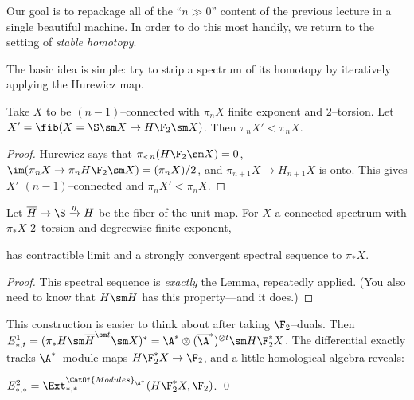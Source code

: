 Our goal is to repackage all of the ``$n \gg 0$'' content of the previous lecture in a single beautiful machine.  In order to do this most handily, we return to the setting of \emph{stable homotopy}.

The basic idea is simple: try to strip a spectrum of its homotopy by iteratively applying the Hurewicz map.

\begin{lemma}
Take $X$ to be $(n-1)$--connected with $\pi_n X$ finite exponent and $2$--torsion.  Let $X' = \fib(X = \S \sm X \to H\F_2 \sm X)$.  Then $\pi_n X' < \pi_n X$.
\end{lemma}
\begin{proof}
Hurewicz says that $\pi_{< n}(H\F_2 \sm X) = 0$, $\im(\pi_n X \to \pi_n H\F_2 \sm X) = (\pi_n X) / 2$, and $\pi_{n+1} X \to H_{n+1} X$ is onto.  This gives $X'$ $(n-1)$--connected and $\pi_n X' < \pi_n X$.
\end{proof}

\begin{theorem}
Let $\overline H \to \S \xrightarrow \eta H$ be the fiber of the unit map.  For $X$ a connected spectrum with $\pi_* X$ $2$--torsion and degreewise finite exponent,
\begin{center}
\end{center}
has contractible limit and a strongly convergent spectral sequence to $\pi_* X$.
\end{theorem}
\begin{proof}
This spectral sequence is \emph{exactly} the Lemma, repeatedly applied.  (You also need to know that $H \sm \overline H$ has this property---and it does.)
\end{proof}

This construction is easier to think about after taking $\F_2$--duals.  Then $E^1_{*, t} = (\pi_* H \sm \overline H^{\sm t} \sm X)^* = \A^* \otimes (\overline{\A}^*)^{\otimes t} \sm H\F_2^* X$.  The differential exactly tracks $\A^*$--module maps $H\F_2^* X \to \F_2$, and a little homological algebra reveals:
\begin{lemma}
$E^2_{*, *} = \Ext^{\CatOf{Modules}_{\A^*}}_{*, *}(H\F_2^* X, \F_2)$. \qed
\end{lemma}

